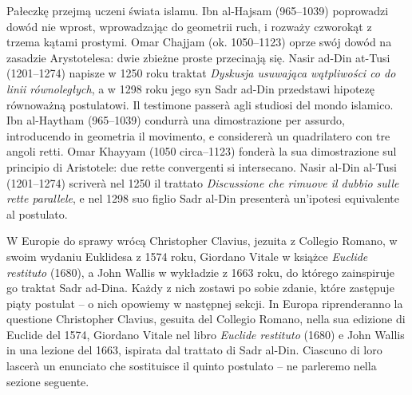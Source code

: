 Pałeczkę przejmą uczeni świata islamu. %
Ibn al-Hajsam (965--1039) poprowadzi dowód nie wprost, wprowadzając do geometrii ruch, i rozważy czworokąt z trzema kątami prostymi. %
Omar Chajjam (ok. 1050--1123) oprze swój dowód na zasadzie Arystotelesa: dwie zbieżne proste przecinają się. %
Nasir ad-Din at-Tusi (1201--1274) napisze w 1250 roku traktat \emph{Dyskusja usuwająca wątpliwości co do linii równoległych}, a w 1298 roku jego syn Sadr ad-Din przedstawi hipotezę równoważną postulatowi. %
Il testimone passerà agli studiosi del mondo islamico. %
Ibn al-Haytham (965--1039) condurrà una dimostrazione per assurdo, introducendo in geometria il movimento, e considererà un quadrilatero con tre angoli retti. %
Omar Khayyam (1050 circa--1123) fonderà la sua dimostrazione sul principio di Aristotele: due rette convergenti si intersecano. %
Nasir al-Din al-Tusi (1201--1274) scriverà nel 1250 il trattato \emph{Discussione che rimuove il dubbio sulle rette parallele}, e nel 1298 suo figlio Sadr al-Din presenterà un'ipotesi equivalente al postulato. %

W Europie do sprawy wrócą Christopher Clavius, jezuita z Collegio Romano, w swoim wydaniu Euklidesa z 1574 roku, Giordano Vitale w książce \emph{Euclide restituto} (1680), a John Wallis w wykładzie z 1663 roku, do którego zainspiruje go traktat Sadr ad-Dina. %
Każdy z nich zostawi po sobie zdanie, które zastępuje piąty postulat -- o nich opowiemy w następnej sekcji. %
In Europa riprenderanno la questione Christopher Clavius, gesuita del Collegio Romano, nella sua edizione di Euclide del 1574, Giordano Vitale nel libro \emph{Euclide restituto} (1680) e John Wallis in una lezione del 1663, ispirata dal trattato di Sadr al-Din. %
Ciascuno di loro lascerà un enunciato che sostituisce il quinto postulato -- ne parleremo nella sezione seguente. %
%
%


